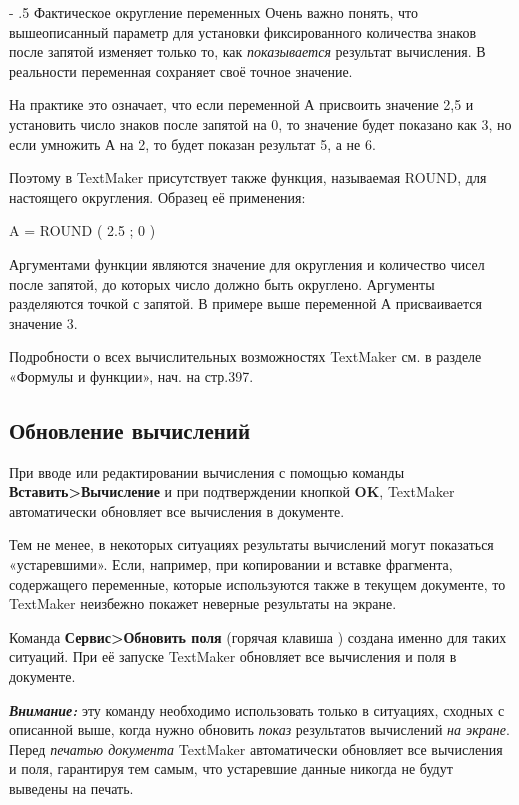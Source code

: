 ﻿\documentclass[a4paper,10pt]{article}
\makeatletter
\renewcommand\paragraph{%
   \@startsection{paragraph}{4}{0mm}%
      {-\baselineskip}%
      {.5\baselineskip}%
      {\normalfont\normalsize\bfseries}}
\makeatother
\begin{document}
\paragraph{Фактическое округление переменных}
Очень важно понять, что вышеописанный параметр для установки фиксированного количества знаков после запятой изменяет только то, как \textit{показывается} результат вычисления. В реальности переменная сохраняет своё точное значение.

На практике это означает, что если переменной А присвоить значение 2,5 и установить число знаков после запятой на 0, то значение будет показано как 3, но если умножить А на 2, то будет показан результат 5, а не 6.

Поэтому в TextMaker присутствует также функция, называемая ROUND, для настоящего округления. Образец её применения:

A = ROUND ( 2.5 ; 0 )

Аргументами функции являются значение для округления и количество чисел после запятой, до которых число должно быть округлено. Аргументы разделяются точкой с запятой. В примере выше переменной А присваивается значение 3.

Подробности о всех вычислительных возможностях TextMaker см. в разделе «Формулы и функции», нач. на стр.397.

\subsection{Обновление вычислений}
При вводе или редактировании вычисления с помощью команды \textbf{Вставить>Вычисление} и при подтверждении кнопкой \textbf{OK}, TextMaker автоматически обновляет все вычисления в документе.

Тем не менее, в некоторых ситуациях результаты вычислений могут показаться «устаревшими». Если, например, при копировании и вставке фрагмента, содержащего переменные, которые используются также в текущем документе, то TextMaker неизбежно покажет неверные результаты на экране.

Команда \textbf{Сервис>Обновить поля} (горячая клавиша ) создана именно для таких ситуаций. При её запуске TextMaker обновляет все вычисления и поля в документе.

\begin{mdframed}[backgroundcolor=blue!10]
\textbf{\textit{Внимание:}} эту команду необходимо использовать только в ситуациях, сходных с описанной выше, когда нужно обновить \textit{показ} результатов вычислений \textit{на экране}. Перед \textit{печатью документа} TextMaker автоматически обновляет все вычисления и поля, гарантируя тем самым, что устаревшие данные никогда не будут выведены на печать.
\end{mdframed}
\end{document}
